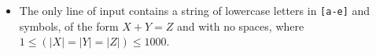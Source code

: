 

\begin{itemize}
    \item The only line of input contains a string of lowercase letters in \texttt{[a-e]}
        and symbols, of the form $X+Y=Z$ and with no spaces, where
        $1 \le (|X| = |Y| = |Z|) \le 1000$.
\end{itemize}

